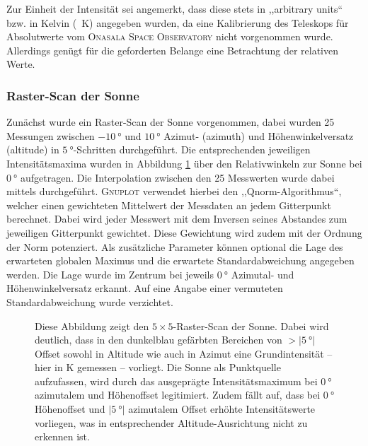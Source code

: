     Zur Einheit der Intensität sei angemerkt, dass diese stets in ,,arbitrary units`` bzw. in Kelvin (\SI{}{\kelvin}) angegeben wurden,
    da eine Kalibrierung des Teleskops für Absolutwerte vom \textsc{Onasala Space Observatory} nicht vorgenommen wurde.
    Allerdings genügt für die geforderten Belange eine Betrachtung der relativen Werte.\\

    \subsubsection{Raster-Scan der Sonne}
    Zunächst wurde ein Raster-Scan der Sonne vorgenommen, dabei wurden 25 Messungen zwischen $\SI{-10}{\degree}$ und $\SI{10}{\degree}$ Azimut- (azimuth) und Höhenwinkelversatz (altitude) in $\SI{5}{\degree}$-Schritten durchgeführt.
    Die entsprechenden jeweiligen Intensitätsmaxima wurden in Abbildung \ref{fig:Sonnenabbild} über den Relativwinkeln zur Sonne bei $\SI{0}{\degree}$ aufgetragen. 
    Die Interpolation zwischen den 25 Messwerten wurde dabei mittels  durchgeführt. 
    \textsc{Gnuplot} verwendet hierbei den ,,Qnorm-Algorithmus``, welcher einen gewichteten Mittelwert der Messdaten an jedem Gitterpunkt berechnet. 
    Dabei wird jeder Messwert mit dem Inversen seines Abstandes zum jeweiligen Gitterpunkt gewichtet. 
    Diese Gewichtung wird zudem mit der Ordnung der Norm potenziert.
    Als zusätzliche Parameter können optional die Lage des erwarteten globalen Maximus und die erwartete Standardabweichung angegeben werden. 
    Die Lage wurde im Zentrum bei jeweils $\SI{0}{\degree}$ Azimutal- und Höhenwinkelversatz erkannt. 
    Auf eine Angabe einer vermuteten Standardabweichung wurde verzichtet.
    \begin{figure}[H]
        \centering
        
        \caption[Raster-Scan der Sonne]{Diese Abbildung zeigt den $5 \times 5$-Raster-Scan der Sonne. Dabei wird deutlich, dass in den dunkelblau gefärbten Bereichen von $>\vert \SI{5}{\degree}\vert$ Offset sowohl in Altitude wie auch in Azimut eine Grundintensität -- hier in \si{\kelvin} gemessen -- vorliegt. Die Sonne als Punktquelle aufzufassen, wird durch das ausgeprägte Intensitätsmaximum bei $\SI{0}{\degree}$ azimutalem und Höhenoffset legitimiert. Zudem fällt auf, dass bei $\SI{0}{\degree}$ Höhenoffset und $\vert\SI{5}{\degree}\vert$ azimutalem Offset erhöhte Intensitätswerte vorliegen, was in entsprechender Altitude-Ausrichtung nicht zu erkennen ist.}
        \label{fig:Sonnenabbild}
    \end{figure}
